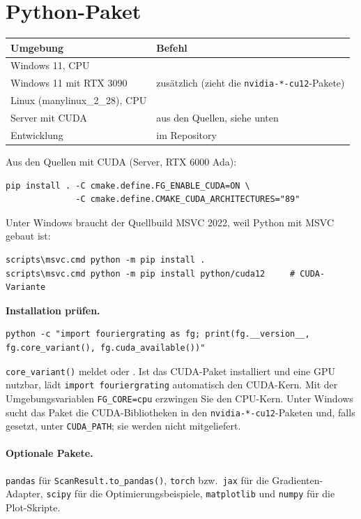 \section{Python-Paket}\label{sec:inst-python}
%
\begin{center}
\small
\begin{tabularx}{\linewidth}{lY}
\toprule
Umgebung & Befehl \\
\midrule
Windows 11, CPU &  \\
Windows 11 mit RTX 3090 & zusätzlich  (zieht die \texttt{nvidia-*-cu12}-Pakete) \\
Linux (manylinux\_2\_28), CPU &  \\
Server mit CUDA & aus den Quellen, siehe unten \\
Entwicklung &  im Repository \\
\bottomrule
\end{tabularx}
\end{center}

Aus den Quellen mit CUDA (Server, RTX 6000 Ada):
\begin{lstlisting}[style=shell]
pip install . -C cmake.define.FG_ENABLE_CUDA=ON \
              -C cmake.define.CMAKE_CUDA_ARCHITECTURES="89"
\end{lstlisting}
Unter Windows braucht der Quellbuild MSVC 2022, weil Python mit MSVC gebaut ist:
\begin{lstlisting}[style=shell]
scripts\msvc.cmd python -m pip install .
scripts\msvc.cmd python -m pip install python/cuda12     # CUDA-Variante
\end{lstlisting}

\textbf{Installation prüfen.}
\begin{lstlisting}[style=shell]
python -c "import fouriergrating as fg; print(fg.__version__, fg.core_variant(), fg.cuda_available())"
\end{lstlisting}
\texttt{core\_variant()} meldet  oder . Ist das CUDA-Paket installiert und eine GPU
nutzbar, lädt \texttt{import fouriergrating} automatisch den CUDA-Kern. Mit der Umgebungsvariablen
\texttt{FG\_CORE=cpu} erzwingen Sie den CPU-Kern. Unter Windows sucht das Paket die CUDA-Bibliotheken in den
\texttt{nvidia-*-cu12}-Paketen und, falls gesetzt, unter \texttt{CUDA\_PATH}; sie werden nicht mitgeliefert.

\paragraph{Optionale Pakete.} \texttt{pandas} für \texttt{ScanResult.to\_pandas()}, \texttt{torch} bzw.\
\texttt{jax} für die Gradienten-Adapter, \texttt{scipy} für die Optimierungsbeispiele, \texttt{matplotlib} und
\texttt{numpy} für die Plot-Skripte.

